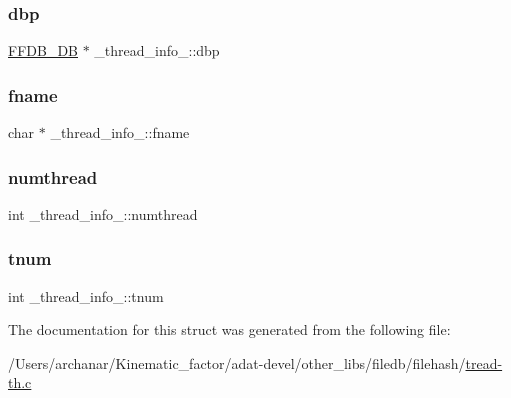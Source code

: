 \subsubsection{\texorpdfstring{dbp}{dbp}}
{\footnotesize\ttfamily \mbox{\hyperlink{adat-devel_2other__libs_2filedb_2filehash_2ffdb__db_8h_a0b27b956926453a7a8141ea8e10f0df8}{F\+F\+D\+B\+\_\+\+DB}} $\ast$ \+\_\+thread\+\_\+info\+\_\+\+::dbp}

\mbox{\label{struct__thread__info___a051f9e6150a37182d882ebc1d982fc7a}} 
\subsubsection{\texorpdfstring{fname}{fname}}
{\footnotesize\ttfamily char $\ast$ \+\_\+thread\+\_\+info\+\_\+\+::fname}

\mbox{\label{struct__thread__info___a5cdfeeb0597f6b8b0cc359894fbae6cc}} 
\subsubsection{\texorpdfstring{numthread}{numthread}}
{\footnotesize\ttfamily int \+\_\+thread\+\_\+info\+\_\+\+::numthread}

\mbox{\label{struct__thread__info___a6a6d76906fe855601083b5ca283faf18}} 
\subsubsection{\texorpdfstring{tnum}{tnum}}
{\footnotesize\ttfamily int \+\_\+thread\+\_\+info\+\_\+\+::tnum}



The documentation for this struct was generated from the following file\+:\begin{DoxyCompactItemize}
\item 
/\+Users/archanar/\+Kinematic\+\_\+factor/adat-\/devel/other\+\_\+libs/filedb/filehash/\mbox{\hyperlink{adat-devel_2other__libs_2filedb_2filehash_2tread-th_8c}{tread-\/th.\+c}}\end{DoxyCompactItemize}
